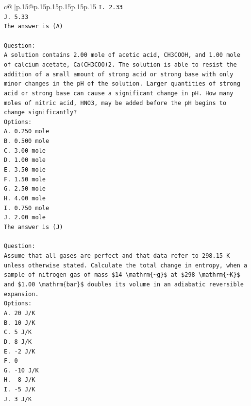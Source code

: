 \documentclass{article}
\begin{document}
{\begin{supertabular}{c@{$\;$}|p{.15\linewidth}@{}p{.15\linewidth}p{.15\linewidth}p{.15\linewidth}p{.15\linewidth}p{.15\linewidth}}
{{{\texttt{I. 2.33} \\
\texttt{J. 5.33} \\
\texttt{The answer is (A)} \\
\\ 
\texttt{Question:} \\
\texttt{A solution contains 2.00 mole of acetic acid, CH3COOH, and 1.00 mole of calcium acetate, Ca(CH3COO)2. The solution is able to resist the addition of a small amount of strong acid or strong base with only minor changes in the pH of the solution. Larger quantities of strong acid or strong base can cause a significant change in pH. How many moles of nitric acid, HNO3, may be added before the pH begins to change significantly?} \\
\texttt{Options:} \\
\texttt{A. 0.250 mole} \\
\texttt{B. 0.500 mole} \\
\texttt{C. 3.00 mole} \\
\texttt{D. 1.00 mole} \\
\texttt{E. 3.50 mole} \\
\texttt{F. 1.50 mole} \\
\texttt{G. 2.50 mole} \\
\texttt{H. 4.00 mole} \\
\texttt{I. 0.750 mole} \\
\texttt{J. 2.00 mole} \\
\texttt{The answer is (J)} \\
\\ 
\texttt{Question:} \\
\texttt{Assume that all gases are perfect and that data refer to 298.15 K unless otherwise stated. Calculate the total change in entropy, when a sample of nitrogen gas of mass \$14 \textbackslash{}mathrm\{\textasciitilde{}g\}\$ at \$298 \textbackslash{}mathrm\{\textasciitilde{}K\}\$ and \$1.00 \textbackslash{}mathrm\{bar\}\$ doubles its volume in an adiabatic reversible expansion.} \\
\texttt{Options:} \\
\texttt{A. 20 J/K} \\
\texttt{B. 10 J/K} \\
\texttt{C. 5 J/K} \\
\texttt{D. 8 J/K} \\
\texttt{E. {-}2 J/K} \\
\texttt{F.  0} \\
\texttt{G. {-}10 J/K} \\
\texttt{H. {-}8 J/K} \\
\texttt{I. {-}5 J/K} \\
\texttt{J. 3 J/K} \\
            }
        }
    }
     \\ \\


\end{supertabular}}
\end{document}
